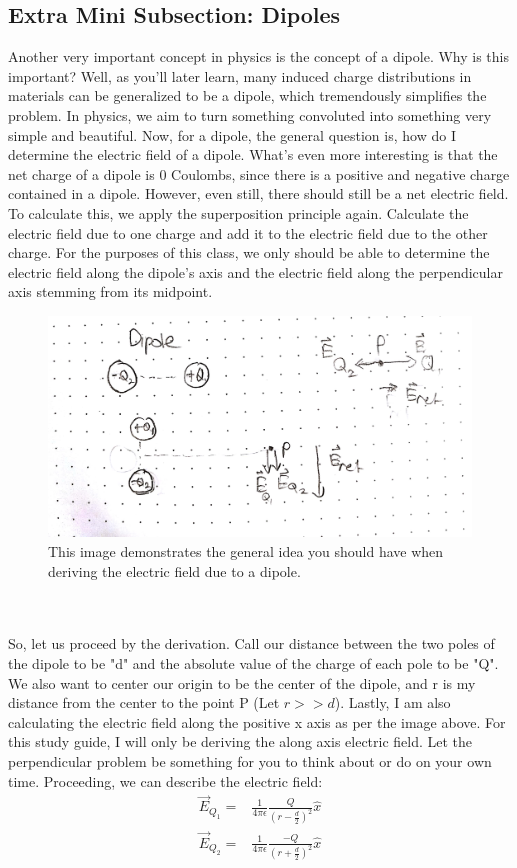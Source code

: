 \documentclass{article}
\begin{document}
\subsection{Extra Mini Subsection: Dipoles}
Another very important concept in physics is the concept of a dipole. Why is this important? Well, as you'll later learn, many induced charge distributions in materials can be generalized to be a dipole, which tremendously simplifies the problem. In physics, we aim to turn something convoluted into something very simple and beautiful. Now, for a dipole, the general question is, how do I determine the electric field of a dipole. What's even more interesting is that the net charge of a dipole is 0 Coulombs, since there is a positive and negative charge contained in a dipole. However, even still, there should still be a net electric field. To calculate this, we apply the superposition principle again. Calculate the electric field due to one charge and add it to the electric field due to the other charge. For the purposes of this class, we only should be able to determine the electric field along the dipole's axis and the electric field along the perpendicular axis stemming from its midpoint.\\
\begin{figure}[ht]
\center
\includegraphics[width=.4\textwidth]{images/Week1pic2.jpg}
\caption{This image demonstrates the general idea you should have when deriving the electric field due to a dipole.}
\end{figure}\\
\\
So, let us proceed by the derivation. Call our distance between the two poles of the dipole to be "d" and the absolute value of the charge of each pole to be "Q". We also want to center our origin to be the center of the dipole, and r is my distance from the center to the point P (Let $r >> d$). Lastly, I am also calculating the electric field along the positive x axis as per the image above. For this study guide, I will only be deriving the along axis electric field. Let the perpendicular problem be something for you to think about or do on your own time. Proceeding, we can describe the electric field: 
\begin{align}
\vec{E}_{Q_1} =& \frac{1}{4\pi\epsilon}\frac{Q}{(r-\frac{d}{2})^2}\hat{x}\\
\vec{E}_{Q_2} =& \frac{1}{4\pi\epsilon}\frac{-Q}{(r+\frac{d}{2})^2}\hat{x}
\end{align}\\
\end{document}
